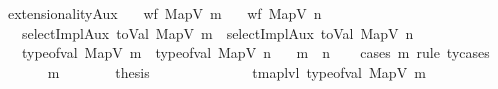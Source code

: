 \begin{isabellebody}
%
\isatagdocument
%
\isamarkuptrue%
%
\isamarkuptrue%
%
\endisatagdocument
{\isafolddocument}%
%
\isadelimdocument
%
\endisadelimdocument
{}\isamarkupfalse%
\ extensionalityAux{\isacharcolon}{\kern0pt}\isanewline
\ \ \ {\isachardoublequoteopen}wf\ {\isacharparenleft}{\kern0pt}MapV\ m{\isacharparenright}{\kern0pt}{\isachardoublequoteclose}\isanewline
\ \ \ {\isachardoublequoteopen}wf\ {\isacharparenleft}{\kern0pt}MapV\ n{\isacharparenright}{\kern0pt}{\isachardoublequoteclose}\isanewline
\ \ \ {\isachardoublequoteopen}selectImplAux\ {\isacharparenleft}{\kern0pt}toVal{}{}{}{}\ {\isacharparenleft}{\kern0pt}MapV\ m{\isacharparenright}{\kern0pt}{\isacharparenright}{\kern0pt}\ {\isacharequal}{\kern0pt}\ selectImplAux\ {\isacharparenleft}{\kern0pt}toVal{}{}{}{}\ {\isacharparenleft}{\kern0pt}MapV\ n{\isacharparenright}{\kern0pt}{\isacharparenright}{\kern0pt}{\isachardoublequoteclose}\isanewline
\ \ \ {\isachardoublequoteopen}type{\isacharunderscore}{\kern0pt}of{\isacharunderscore}{\kern0pt}val\ {\isacharparenleft}{\kern0pt}MapV\ m{\isacharparenright}{\kern0pt}\ {\isacharequal}{\kern0pt}\ type{\isacharunderscore}{\kern0pt}of{\isacharunderscore}{\kern0pt}val\ {\isacharparenleft}{\kern0pt}MapV\ n{\isacharparenright}{\kern0pt}{\isachardoublequoteclose}\isanewline
\ \ \ {\isachardoublequoteopen}m\ {\isacharequal}{\kern0pt}\ n{\isachardoublequoteclose}\isanewline
%
\isadelimproof
\ \ %
\endisadelimproof
%
\isatagproof
{}\isamarkupfalse%
\ {\isacharparenleft}{\kern0pt}cases\ m\ rule{\isacharcolon}{\kern0pt}\ ty{}{}{}{\isachardot}{\kern0pt}cases{\isacharparenright}{\kern0pt}\isanewline
\ \ \ \ \isamarkupfalse%
\ {\isacharparenleft}{\kern0pt}{}\ m{\isacharprime}{\kern0pt}{\isacharparenright}{\kern0pt}\isanewline
\ \ \ \ \isamarkupfalse%
\ \isamarkupfalse%
\ {\isacharquery}{\kern0pt}thesis\isanewline
\ \ \ \ \isamarkupfalse%
\ {\isacharminus}{\kern0pt}\isanewline
\ \ \ \ \ \ \isamarkupfalse%
\ {\isachardoublequoteopen}tmap{\isacharunderscore}{\kern0pt}lvl\ {\isacharparenleft}{\kern0pt}type{\isacharunderscore}{\kern0pt}of{\isacharunderscore}{\kern0pt}val\ {\isacharparenleft}{\kern0pt}MapV\ m{\isacharparenright}{\kern0pt}{\isacharparenright}{\kern0pt}\ {\isacharequal}{\kern0pt}\ {}{\isachardoublequoteclose}\isanewline

\end{isabellebody}
